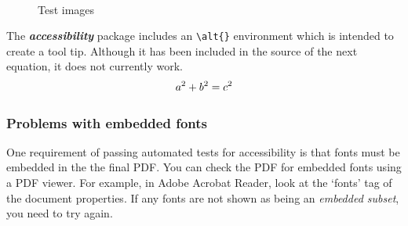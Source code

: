 \documentclass[12pt,letterpaper]{article}
\newcommand{\packagename}[1]{\textbf{\emph{#1}}}
\begin{document}
\begin{figure}[htp]
\centering
{}
~
\caption{Test images}\label{fig:TestimagesWithAltText}
\end{figure}

The \packagename{accessibility} package includes an \verb+\alt{}+ environment which is intended to create a tool tip. Although it has been included in the source of the next equation, it does not currently work.
\begin{equation}
\alt{a squared plus b squared equals c squared}
a^2+b^2=c^2
\end{equation}

\subsubsection{Problems with embedded fonts}
One requirement of passing automated tests for accessibility is that fonts must be embedded in the the final PDF. You can check the PDF for embedded fonts using a PDF viewer. For example, in Adobe Acrobat Reader, look at the `fonts' tag of the document properties. If any fonts are not shown as being an \emph{embedded subset}, you need to try again. 
\end{document}
